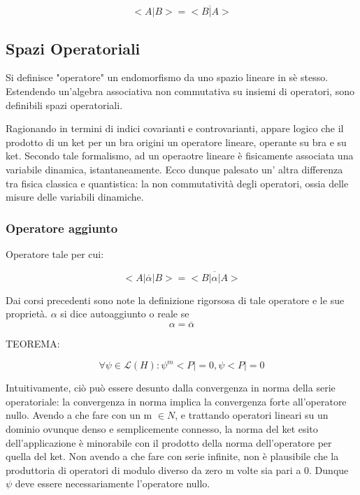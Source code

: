 \documentclass{article}
\begin{document}
\begin{equation}
    <A|B> = \overline{<B|A>}
\end{equation}

\subsection{Spazi Operatoriali}

Si definisce "operatore" un endomorfismo da uno spazio lineare in sè stesso.
Estendendo un'algebra associativa non commutativa su insiemi di operatori, sono definibili spazi operatoriali.

Ragionando in termini di indici covarianti e controvarianti, appare logico che il prodotto di un ket per un bra origini un operatore lineare, operante su bra e su ket.
Secondo tale formalismo, ad un operaotre lineare è fisicamente associata una variabile dinamica, istantaneamente.
Ecco dunque palesato un' altra differenza tra fisica classica e quantistica: la non commutatività degli operatori, ossia delle misure delle variabili dinamiche.


\subsubsection{Operatore aggiunto}
Operatore tale per cui:

\begin{equation}
    <A|\overline{\alpha}|B>= \overline{<B|\alpha|A>}
\end{equation}

Dai corsi precedenti sono note la definizione rigorsosa di tale operatore e le sue proprietà.
$\alpha$ si dice autoaggiunto o reale se
\begin{equation}
    \alpha=\overline{\alpha}
\end{equation}

TEOREMA:


\begin{equation}
    \forall \psi \in \mathcal{L}(H) : \psi^m <P|=0 , \psi <P|=0
\end{equation}

Intuitivamente, ciò può essere desunto dalla convergenza in norma della serie operatoriale:
la convergenza in norma implica la convergenza forte all'operatore nullo. Avendo a che fare con un m $\in N$, e trattando
operatori lineari su un dominio ovunque denso e semplicemente connesso, la norma del ket esito dell'applicazione è minorabile
con il prodotto della norma dell'operatore per quella del ket. Non avendo a che fare con serie infinite, non è plausibile che la produttoria
di operatori di modulo diverso da zero m volte sia pari a 0. Dunque $\psi$ deve essere necessariamente l'operatore nullo.
\end{document}
